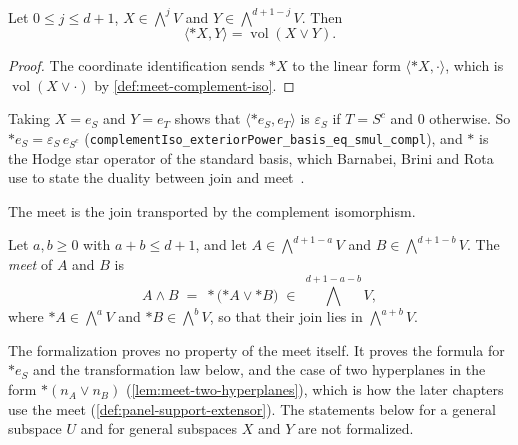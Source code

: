 \begin{lemma}
  \label{lem:complement-iso-toDual}
  \leanok
  Let $0 \le j \le d+1$, $X \in \bigwedge^{j} V$ and
  $Y \in \bigwedge^{d+1-j} V$. Then
  \[
    \langle *X, Y \rangle = \operatorname{vol}(X \vee Y).
  \]
\end{lemma}
\begin{proof}
  \leanok
  The coordinate identification sends $*X$ to the linear form
  $\langle *X, \cdot \rangle$, which is
  $\operatorname{vol}(X \vee \cdot)$ by \cref{def:meet-complement-iso}.
\end{proof}

Taking $X = e_S$ and $Y = e_T$ shows that
$\langle *e_S, e_T \rangle$ is $\varepsilon_S$ if $T = S^c$ and $0$
otherwise. So $*e_S = \varepsilon_S\, e_{S^c}$
(\texttt{complementIso\_\allowbreak{}exteriorPower\_\allowbreak{}basis\_\allowbreak{}eq\_\allowbreak{}smul\_\allowbreak{}compl}),
and $*$ is the Hodge star operator of the standard basis, which Barnabei,
Brini and Rota use to state the duality between join and
meet~\cite[p.~146]{barnabeiBriniRota1985}.

The meet is the join transported by the complement isomorphism.

\begin{definition}
  \label{def:meet}
  \leanok
  Let $a, b \ge 0$ with $a + b \le d+1$, and let
  $A \in \bigwedge^{d+1-a} V$ and $B \in \bigwedge^{d+1-b} V$. The
  \emph{meet} of $A$ and $B$ is
  \[
    A \wedge B \;=\; *\bigl({*A} \vee {*B}\bigr)
    \;\in\; \textstyle\bigwedge^{d+1-a-b} V,
  \]
  where ${*A} \in \bigwedge^{a} V$ and ${*B} \in \bigwedge^{b} V$, so
  that their join lies in $\bigwedge^{a+b} V$.
\end{definition}
\begin{fmlnote}
  The formalization proves no property of the meet itself. It proves the
  formula for $*e_S$ and the transformation law below, and the case of
  two hyperplanes in the form $*(n_A \vee n_B)$
  (\cref{lem:meet-two-hyperplanes}), which is how the later chapters use
  the meet (\cref{def:panel-support-extensor}). The
  statements below for a general subspace $U$ and for general subspaces
  $X$ and $Y$ are not formalized.
\end{fmlnote}

